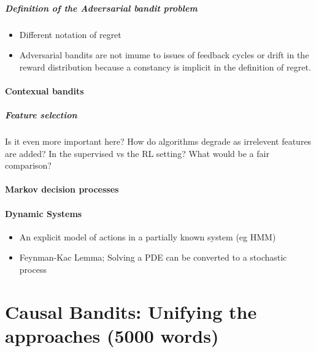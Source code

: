 \documentclass[11pt,a4paper,oneside]{book}
\begin{document}
\paragraph*{Definition of the Adversarial bandit problem}
\begin{itemize}
\item Different notation of regret
\item Adversarial bandits are not imume to issues of feedback cycles or drift in the reward distribution because a constancy is implicit in the definition of regret. 
\end{itemize}

\subsubsection*{Contexual bandits}
\paragraph*{Feature selection} Is it even more important here? How do algorithms degrade as irrelevent features are added? In the supervised vs the RL setting? What would be a fair comparison?

\subsubsection*{Markov decision processes}
\subsubsection*{Dynamic Systems}
\begin{itemize}
\item An explicit model of actions in a partially known system (eg HMM)
\item Feynman-Kac Lemma; Solving a PDE can be converted to a stochastic process
\end{itemize}


\chapter*{Causal Bandits: Unifying the approaches (5000 words)}
\end{document}
